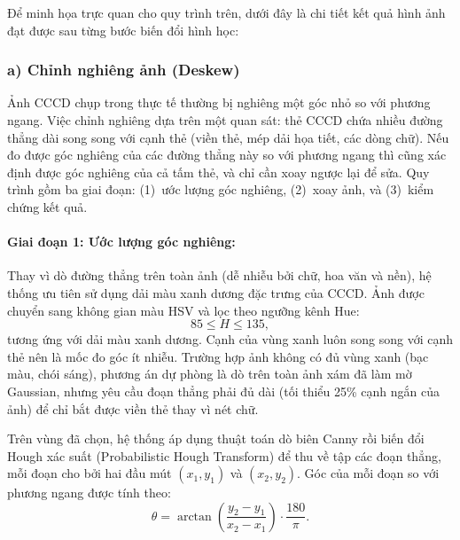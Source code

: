 Để minh họa trực quan cho quy trình trên, dưới đây là chi tiết kết quả hình ảnh đạt được sau từng bước biến đổi hình học:

\subsubsection*{a) Chỉnh nghiêng ảnh (Deskew)}
\label{sssec:deskew}

Ảnh CCCD chụp trong thực tế thường bị nghiêng một góc nhỏ so với phương ngang. Việc chỉnh nghiêng dựa trên một quan sát: thẻ CCCD chứa nhiều đường thẳng dài song song với cạnh thẻ (viền thẻ, mép dải họa tiết, các dòng chữ). Nếu đo được góc nghiêng của các đường thẳng này so với phương ngang thì cũng xác định được góc nghiêng của cả tấm thẻ, và chỉ cần xoay ngược lại để sửa. Quy trình gồm ba giai đoạn: (1)~ước lượng góc nghiêng, (2)~xoay ảnh, và (3)~kiểm chứng kết quả.

\paragraph{Giai đoạn 1: Ước lượng góc nghiêng:}
Thay vì dò đường thẳng trên toàn ảnh (dễ nhiễu bởi chữ, hoa văn và nền), hệ thống ưu tiên sử dụng dải màu xanh dương đặc trưng của CCCD. Ảnh được chuyển sang không gian màu HSV và lọc theo ngưỡng kênh Hue:
\begin{equation}
  85 \le H \le 135,
\end{equation}
tương ứng với dải màu xanh dương. Cạnh của vùng xanh luôn song song với cạnh thẻ nên là mốc đo góc ít nhiễu. Trường hợp ảnh không có đủ vùng xanh (bạc màu, chói sáng), phương án dự phòng là dò trên toàn ảnh xám đã làm mờ Gaussian, nhưng yêu cầu đoạn thẳng phải đủ dài (tối thiểu 25\% cạnh ngắn của ảnh) để chỉ bắt được viền thẻ thay vì nét chữ.

Trên vùng đã chọn, hệ thống áp dụng thuật toán dò biên Canny rồi biến đổi Hough xác suất (Probabilistic Hough Transform) để thu về tập các đoạn thẳng, mỗi đoạn cho bởi hai đầu mút $(x_1, y_1)$ và $(x_2, y_2)$. Góc của mỗi đoạn so với phương ngang được tính theo:
\begin{equation}
  \theta = \arctan\!\left(\frac{y_2 - y_1}{x_2 - x_1}\right) \cdot \frac{180}{\pi}.
\end{equation}

